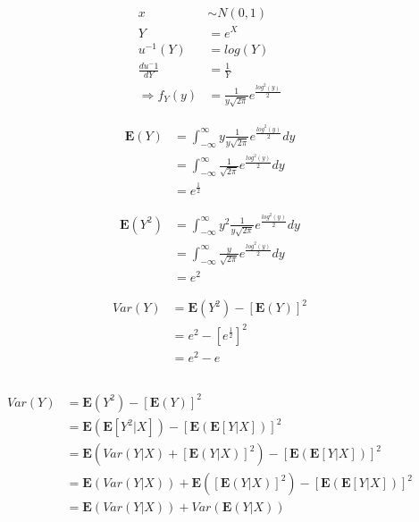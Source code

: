 \documentclass[12pt,a4paper]{article}
\begin{document}
\subsection{}
\begin{align}
x &\sim N(0, 1)\\
Y &= e^X\\
u^{-1}(Y) &= log(Y) \\
\frac{du^-1}{dY} &= \frac{1}{Y}\\
\Rightarrow f_Y(y) &= \frac{1}{y \sqrt{2\pi}} e^{\frac{log^2(y)}{2}}
\end{align}

\begin{align*}
\mathbf{E}(Y) &= \int^{\infty}_{-\infty} y \frac{1}{y \sqrt{2\pi}} e^{\frac{log^2(y)}{2}}dy\\
&= \int^{\infty}_{-\infty} \frac{1}{\sqrt{2\pi}} e^{\frac{log^2(y)}{2}}dy\\
&= e^{\frac{1}{2}}
\end{align*}

\begin{align*}
\mathbf{E}(Y^2) &= \int^{\infty}_{-\infty} y^2 \frac{1}{y \sqrt{2\pi}} e^{\frac{log^2(y)}{2}}dy\\
&= \int^{\infty}_{-\infty} \frac{y}{\sqrt{2\pi}} e^{\frac{log^2(y)}{2}}dy\\
&= e^{2}
\end{align*}

\begin{align*}
Var(Y) &= \mathbf{E}(Y^2) - [\mathbf{E}(Y)]^2\\
&= e^{2} - [e^{\frac{1}{2}}]^2\\
&= e^{2} - e
\end{align*}

\subsection{}
\begin{align*}
Var(Y) &= \mathbf{E}(Y^2) - [\mathbf{E}(Y)]^2\\
&= \mathbf{E}(\mathbf{E}[Y^2| X]) - [\mathbf{E}(\mathbf{E}[Y| X])]^2\\
&= \mathbf{E}(Var(Y|X) + [\mathbf{E}(Y | X)]^2) - [\mathbf{E}(\mathbf{E}[Y| X])]^2\\
&= \mathbf{E}(Var(Y|X)) + \mathbf{E}([\mathbf{E}(Y | X)]^2) - [\mathbf{E}(\mathbf{E}[Y| X])]^2\\
&= \mathbf{E}(Var(Y|X)) + Var(\mathbf{E}(Y|X))
\end{align*}
\end{document}

